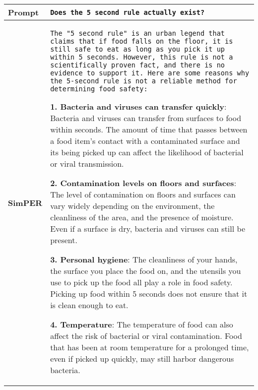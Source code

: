 \begin{table}[!h]
    \centering
    \ttfamily
    \small
        \begin{tabular}{lp{11.5cm}}
        \toprule[1pt]
        \bf{Prompt} & \texttt{Does the 5 second rule actually exist?}\\
        \midrule
        \bf{SimPER} & 
\texttt{The "5 second rule" is an urban legend that claims that if food falls on the floor, it is still safe to eat as long as you pick it up within 5 seconds. However, this rule is not a scientifically proven fact, and there is no evidence to support it. Here are some reasons why the 5-second rule is not a reliable method for determining food safety:}\newline


\textbf{1. Bacteria and viruses can transfer quickly}: Bacteria and viruses can transfer from surfaces to food within seconds. The amount of time that passes between a food item's contact with a contaminated surface and its being picked up can affect the likelihood of bacterial or viral transmission. \newline

\textbf{2. Contamination levels on floors and surfaces}: The level of contamination on floors and surfaces can vary widely depending on the environment, the cleanliness of the area, and the presence of moisture. Even if a surface is dry, bacteria and viruses can still be present.\newline

\textbf{3. Personal hygiene}: The cleanliness of your hands, the surface you place the food on, and the utensils you use to pick up the food all play a role in food safety. Picking up food within 5 seconds does not ensure that it is clean enough to eat.\newline

\textbf{4. Temperature}: The temperature of food can also affect the risk of bacterial or viral contamination. Food that has been at room temperature for a prolonged time, even if picked up quickly, may still harbor dangerous bacteria.\newline


\end{tabular}
\end{table}
